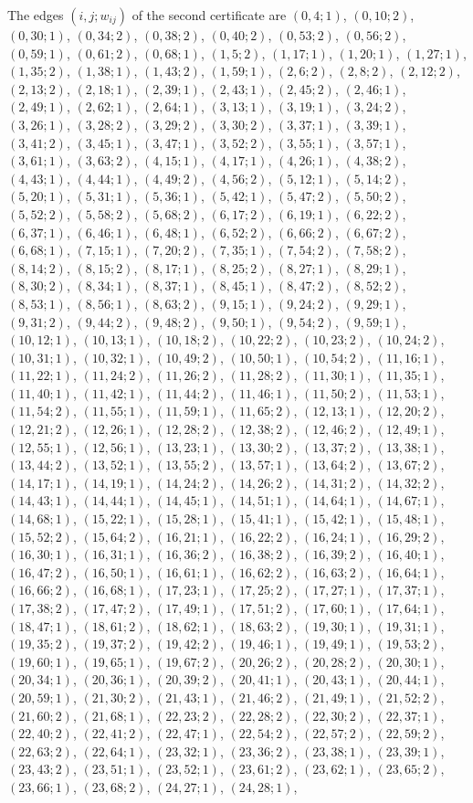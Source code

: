 \documentclass[11pt]{article}
\begin{document}
The edges $(i,j;w_{ij})$ of the second certificate are $(0,4;1)$, $(0,10;2)$, $(0,30;1)$, $(0,34;2)$, $(0,38;2)$, $(0,40;2)$, $(0,53;2)$, $(0,56;2)$, $(0,59;1)$, $(0,61;2)$, $(0,68;1)$, $(1,5;2)$, $(1,17;1)$, $(1,20;1)$, $(1,27;1)$, $(1,35;2)$, $(1,38;1)$, $(1,43;2)$, $(1,59;1)$, $(2,6;2)$, $(2,8;2)$, $(2,12;2)$, $(2,13;2)$, $(2,18;1)$, $(2,39;1)$, $(2,43;1)$, $(2,45;2)$, $(2,46;1)$, $(2,49;1)$, $(2,62;1)$, $(2,64;1)$, $(3,13;1)$, $(3,19;1)$, $(3,24;2)$, $(3,26;1)$, $(3,28;2)$, $(3,29;2)$, $(3,30;2)$, $(3,37;1)$, $(3,39;1)$, $(3,41;2)$, $(3,45;1)$, $(3,47;1)$, $(3,52;2)$, $(3,55;1)$, $(3,57;1)$, $(3,61;1)$, $(3,63;2)$, $(4,15;1)$, $(4,17;1)$, $(4,26;1)$, $(4,38;2)$, $(4,43;1)$, $(4,44;1)$, $(4,49;2)$, $(4,56;2)$, $(5,12;1)$, $(5,14;2)$, $(5,20;1)$, $(5,31;1)$, $(5,36;1)$, $(5,42;1)$, $(5,47;2)$, $(5,50;2)$, $(5,52;2)$, $(5,58;2)$, $(5,68;2)$, $(6,17;2)$, $(6,19;1)$, $(6,22;2)$, $(6,37;1)$, $(6,46;1)$, $(6,48;1)$, $(6,52;2)$, $(6,66;2)$, $(6,67;2)$, $(6,68;1)$, $(7,15;1)$, $(7,20;2)$, $(7,35;1)$, $(7,54;2)$, $(7,58;2)$, $(8,14;2)$, $(8,15;2)$, $(8,17;1)$, $(8,25;2)$, $(8,27;1)$, $(8,29;1)$, $(8,30;2)$, $(8,34;1)$, $(8,37;1)$, $(8,45;1)$, $(8,47;2)$, $(8,52;2)$, $(8,53;1)$, $(8,56;1)$, $(8,63;2)$, $(9,15;1)$, $(9,24;2)$, $(9,29;1)$, $(9,31;2)$, $(9,44;2)$, $(9,48;2)$, $(9,50;1)$, $(9,54;2)$, $(9,59;1)$, $(10,12;1)$, $(10,13;1)$, $(10,18;2)$, $(10,22;2)$, $(10,23;2)$, $(10,24;2)$, $(10,31;1)$, $(10,32;1)$, $(10,49;2)$, $(10,50;1)$, $(10,54;2)$, $(11,16;1)$, $(11,22;1)$, $(11,24;2)$, $(11,26;2)$, $(11,28;2)$, $(11,30;1)$, $(11,35;1)$, $(11,40;1)$, $(11,42;1)$, $(11,44;2)$, $(11,46;1)$, $(11,50;2)$, $(11,53;1)$, $(11,54;2)$, $(11,55;1)$, $(11,59;1)$, $(11,65;2)$, $(12,13;1)$, $(12,20;2)$, $(12,21;2)$, $(12,26;1)$, $(12,28;2)$, $(12,38;2)$, $(12,46;2)$, $(12,49;1)$, $(12,55;1)$, $(12,56;1)$, $(13,23;1)$, $(13,30;2)$, $(13,37;2)$, $(13,38;1)$, $(13,44;2)$, $(13,52;1)$, $(13,55;2)$, $(13,57;1)$, $(13,64;2)$, $(13,67;2)$, $(14,17;1)$, $(14,19;1)$, $(14,24;2)$, $(14,26;2)$, $(14,31;2)$, $(14,32;2)$, $(14,43;1)$, $(14,44;1)$, $(14,45;1)$, $(14,51;1)$, $(14,64;1)$, $(14,67;1)$, $(14,68;1)$, $(15,22;1)$, $(15,28;1)$, $(15,41;1)$, $(15,42;1)$, $(15,48;1)$, $(15,52;2)$, $(15,64;2)$, $(16,21;1)$, $(16,22;2)$, $(16,24;1)$, $(16,29;2)$, $(16,30;1)$, $(16,31;1)$, $(16,36;2)$, $(16,38;2)$, $(16,39;2)$, $(16,40;1)$, $(16,47;2)$, $(16,50;1)$, $(16,61;1)$, $(16,62;2)$, $(16,63;2)$, $(16,64;1)$, $(16,66;2)$, $(16,68;1)$, $(17,23;1)$, $(17,25;2)$, $(17,27;1)$, $(17,37;1)$, $(17,38;2)$, $(17,47;2)$, $(17,49;1)$, $(17,51;2)$, $(17,60;1)$, $(17,64;1)$, $(18,47;1)$, $(18,61;2)$, $(18,62;1)$, $(18,63;2)$, $(19,30;1)$, $(19,31;1)$, $(19,35;2)$, $(19,37;2)$, $(19,42;2)$, $(19,46;1)$, $(19,49;1)$, $(19,53;2)$, $(19,60;1)$, $(19,65;1)$, $(19,67;2)$, $(20,26;2)$, $(20,28;2)$, $(20,30;1)$, $(20,34;1)$, $(20,36;1)$, $(20,39;2)$, $(20,41;1)$, $(20,43;1)$, $(20,44;1)$, $(20,59;1)$, $(21,30;2)$, $(21,43;1)$, $(21,46;2)$, $(21,49;1)$, $(21,52;2)$, $(21,60;2)$, $(21,68;1)$, $(22,23;2)$, $(22,28;2)$, $(22,30;2)$, $(22,37;1)$, $(22,40;2)$, $(22,41;2)$, $(22,47;1)$, $(22,54;2)$, $(22,57;2)$, $(22,59;2)$, $(22,63;2)$, $(22,64;1)$, $(23,32;1)$, $(23,36;2)$, $(23,38;1)$, $(23,39;1)$, $(23,43;2)$, $(23,51;1)$, $(23,52;1)$, $(23,61;2)$, $(23,62;1)$, $(23,65;2)$, $(23,66;1)$, $(23,68;2)$, $(24,27;1)$, $(24,28;1)$, 
\end{document}
